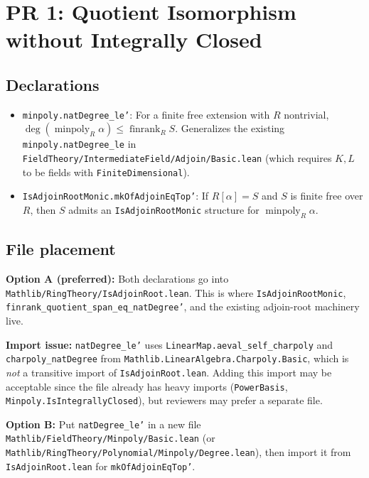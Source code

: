 \section{PR 1: Quotient Isomorphism without Integrally Closed}
\label{sec:pr1}

\subsection*{Declarations}

\begin{itemize}
  \item \texttt{minpoly.natDegree\_le'}: For a finite free extension with
    $R$ nontrivial, $\deg(\operatorname{minpoly}_R \alpha) \le \operatorname{finrank}_R S$.
    Generalizes the existing \texttt{minpoly.natDegree\_le} in
    \texttt{FieldTheory/IntermediateField/Adjoin/Basic.lean}
    (which requires $K, L$ to be fields with \texttt{FiniteDimensional}).
  \item \texttt{IsAdjoinRootMonic.mkOfAdjoinEqTop'}: If $R[\alpha] = S$ and $S$ is
    finite free over $R$, then $S$ admits an \texttt{IsAdjoinRootMonic}
    structure for $\operatorname{minpoly}_R \alpha$.
\end{itemize}

\subsection*{File placement}

\textbf{Option A (preferred):} Both declarations go into
\texttt{Mathlib/RingTheory/IsAdjoinRoot.lean}.
This is where \texttt{IsAdjoinRootMonic}, \texttt{finrank\_quotient\_span\_eq\_natDegree'},
and the existing adjoin-root machinery live.

\textbf{Import issue:} \texttt{natDegree\_le'} uses
\texttt{LinearMap.aeval\_self\_charpoly} and \texttt{charpoly\_natDegree}
from \texttt{Mathlib.LinearAlgebra.Charpoly.Basic}, which is \emph{not}
a transitive import of \texttt{IsAdjoinRoot.lean}.
Adding this import may be acceptable since the file already has heavy imports
(\texttt{PowerBasis}, \texttt{Minpoly.IsIntegrallyClosed}), but reviewers
may prefer a separate file.

\textbf{Option B:} Put \texttt{natDegree\_le'} in a new file
\texttt{Mathlib/FieldTheory/Minpoly/Basic.lean} (or
\texttt{Mathlib/RingTheory/Polynomial/Minpoly/Degree.lean}),
then import it from \texttt{IsAdjoinRoot.lean} for \texttt{mkOfAdjoinEqTop'}.


